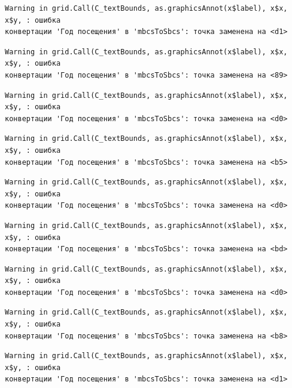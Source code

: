 \documentclass[
  letterpaper,
  DIV=11,
  numbers=noendperiod]{scrreprt}
\begin{document}
\begin{verbatim}
Warning in grid.Call(C_textBounds, as.graphicsAnnot(x$label), x$x, x$y, : ошибка
конвертации 'Год посещения' в 'mbcsToSbcs': точка заменена на <d1>
\end{verbatim}

\begin{verbatim}
Warning in grid.Call(C_textBounds, as.graphicsAnnot(x$label), x$x, x$y, : ошибка
конвертации 'Год посещения' в 'mbcsToSbcs': точка заменена на <89>
\end{verbatim}

\begin{verbatim}
Warning in grid.Call(C_textBounds, as.graphicsAnnot(x$label), x$x, x$y, : ошибка
конвертации 'Год посещения' в 'mbcsToSbcs': точка заменена на <d0>
\end{verbatim}

\begin{verbatim}
Warning in grid.Call(C_textBounds, as.graphicsAnnot(x$label), x$x, x$y, : ошибка
конвертации 'Год посещения' в 'mbcsToSbcs': точка заменена на <b5>
\end{verbatim}

\begin{verbatim}
Warning in grid.Call(C_textBounds, as.graphicsAnnot(x$label), x$x, x$y, : ошибка
конвертации 'Год посещения' в 'mbcsToSbcs': точка заменена на <d0>
\end{verbatim}

\begin{verbatim}
Warning in grid.Call(C_textBounds, as.graphicsAnnot(x$label), x$x, x$y, : ошибка
конвертации 'Год посещения' в 'mbcsToSbcs': точка заменена на <bd>
\end{verbatim}

\begin{verbatim}
Warning in grid.Call(C_textBounds, as.graphicsAnnot(x$label), x$x, x$y, : ошибка
конвертации 'Год посещения' в 'mbcsToSbcs': точка заменена на <d0>
\end{verbatim}

\begin{verbatim}
Warning in grid.Call(C_textBounds, as.graphicsAnnot(x$label), x$x, x$y, : ошибка
конвертации 'Год посещения' в 'mbcsToSbcs': точка заменена на <b8>
\end{verbatim}

\begin{verbatim}
Warning in grid.Call(C_textBounds, as.graphicsAnnot(x$label), x$x, x$y, : ошибка
конвертации 'Год посещения' в 'mbcsToSbcs': точка заменена на <d1>
\end{verbatim}
\end{document}
